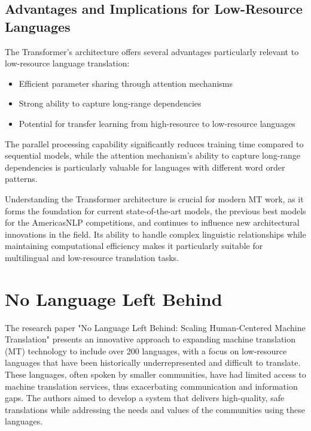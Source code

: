 \subsection{Advantages and Implications for Low-Resource Languages}
The Transformer's architecture offers several advantages particularly relevant to low-resource language translation:
\begin{itemize}
    \item Efficient parameter sharing through attention mechanisms
    \item Strong ability to capture long-range dependencies
    \item Potential for transfer learning from high-resource to low-resource languages
\end{itemize}

The parallel processing capability significantly reduces training time compared to sequential models, while the attention mechanism's ability to capture long-range dependencies is particularly valuable for languages with different word order patterns.

Understanding the Transformer architecture is crucial for modern MT work, as it forms the foundation for current state-of-the-art models, the previous best models for the AmericasNLP competitions, and continues to influence new architectural innovations in the field. Its ability to handle complex linguistic relationships while maintaining computational efficiency makes it particularly suitable for multilingual and low-resource translation tasks.

\section{No Language Left Behind}
The research paper "No Language Left Behind: Scaling Human-Centered Machine Translation" \cite{nllbteam2022languageleftbehindscaling} presents an innovative approach to expanding machine translation (MT) technology to include over 200 languages, with a focus on low-resource languages that have been historically underrepresented and difficult to translate. These languages, often spoken by smaller communities, have had limited access to machine translation services, thus exacerbating communication and information gaps. The authors aimed to develop a system that delivers high-quality, safe translations while addressing the needs and values of the communities using these languages. 

